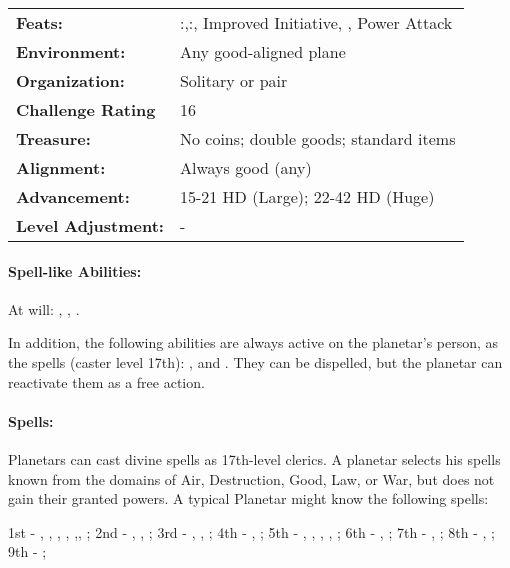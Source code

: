 \begin{table*}
{\begin{tabular}{p{}p{}}
\textbf{Feats:}			&\nameref{Feat:ExpandedKnowledge}:\nameref{Spell:CureWounds},\nameref{Feat:ExpandedKnowledge}:\nameref{Spell:RaiseDead}, Improved Initiative, \nameref{Feat:QuickenSpell}, Power Attack\\
\textbf{Environment:}		&Any good-aligned plane\\
\textbf{Organization:}		&Solitary or pair\\
\textbf{Challenge Rating}	&16\\
\textbf{Treasure:}		&No coins; double goods; standard items\\
\textbf{Alignment:}		&Always good (any)\\
\textbf{Advancement:}		&15-21 HD (Large); 22-42 HD (Huge)\\
\textbf{Level Adjustment:}	&-\\
\bottomrule
\end{tabular}}
\end{table*}
\paragraph{Spell-like Abilities:}
At will: , , .

In addition, the following abilities are always active on the planetar's person, as the spells (caster level 17th): , and . They can be dispelled, but the planetar can reactivate them as a free action.
\paragraph{Spells:} Planetars can cast divine spells as 17th-level clerics. A planetar selects his spells known from the domains of Air, Destruction, Good, Law, or War, but does not gain their granted powers. A typical Planetar might know the following spells:

1st - , , , , ,, ;
2nd - , , ;
3rd - , , ;
4th - , ;
5th - , , , , ;
6th - , ;
7th - , ;
8th - , ;
9th - ;

